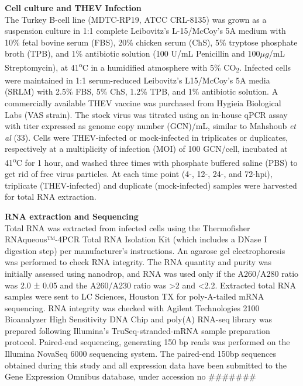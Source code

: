 \documentclass[
]{article}
\begin{document}
\textbf{Cell culture and THEV Infection}\\
The Turkey B-cell line (MDTC-RP19, ATCC CRL-8135) was grown as a
suspension culture in 1:1 complete Leibovitz's L-15/McCoy's 5A medium
with 10\% fetal bovine serum (FBS), 20\% chicken serum (ChS), 5\%
tryptose phosphate broth (TPB), and 1\% antibiotic solution (100 U/mL
Penicillin and 100\(\mu g\)/mL Streptomycin), at 41\textsuperscript{o}C
in a humidified atmosphere with 5\% CO\textsubscript{2}. Infected cells
were maintained in 1:1 serum-reduced Leibovitz's L15/McCoy's 5A media
(SRLM) with 2.5\% FBS, 5\% ChS, 1.2\% TPB, and 1\% antibiotic solution.
A commercially available THEV vaccine was purchased from Hygieia
Biological Labs (VAS strain). The stock virus was titrated using an
in-house qPCR assay with titer expressed as genome copy number (GCN)/mL,
similar to Mahshoub \emph{et al} (33). Cells were THEV-infected or
mock-infected in triplicates or duplicates, respectively at a
multiplicity of infection (MOI) of 100 GCN/cell, incubated at
41\textsuperscript{o}C for 1 hour, and washed three times with phosphate
buffered saline (PBS) to get rid of free virus particles. At each time
point (4-, 12-, 24-, and 72-hpi), triplicate (THEV-infected) and
duplicate (mock-infected) samples were harvested for total RNA
extraction.

\textbf{RNA extraction and Sequencing}\\
Total RNA was extracted from infected cells using the Thermofisher
RNAqueous™-4PCR Total RNA Isolation Kit (which includes a DNase I
digestion step) per manufacturer's instructions. An agarose gel
electrophoresis was performed to check RNA integrity. The RNA quantity
and purity was initially assessed using nanodrop, and RNA was used only
if the A260/A280 ratio was 2.0 ± 0.05 and the A260/A230 ratio was
\textgreater2 and \textless2.2. Extracted total RNA samples were sent to
LC Sciences, Houston TX for poly-A-tailed mRNA sequencing. RNA integrity
was checked with Agilent Technologies 2100 Bioanalyzer High Sensitivity
DNA Chip and poly(A) RNA-seq library was prepared following Illumina's
TruSeq-stranded-mRNA sample preparation protocol. Paired-end sequencing,
generating 150 bp reads was performed on the Illumina NovaSeq 6000
sequencing system. The paired-end 150bp sequences obtained during this
study and all expression data have been submitted to the Gene Expression
Omnibus database, under accession no \#\#\#\#\#\#\#
\end{document}
